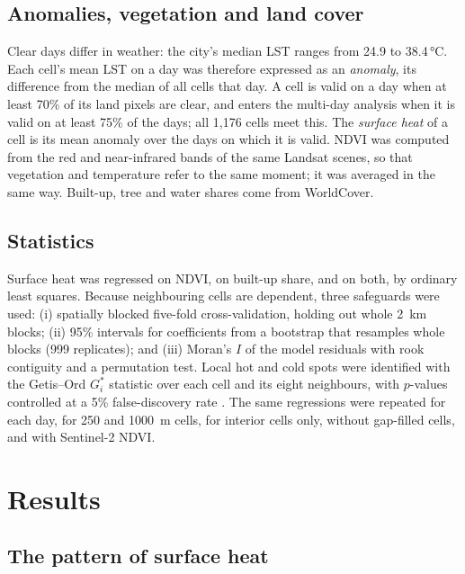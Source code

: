 \documentclass[11pt,a4paper]{article}
\begin{document}
\subsection{Anomalies, vegetation and land cover}

Clear days differ in weather: the city's median LST ranges from 24.9 to 38.4\,°C. Each cell's mean LST on a day was therefore expressed as an \emph{anomaly}, its difference from the median of all cells that day. A cell is valid on a day when at least 70\% of its land pixels are clear, and enters the multi-day analysis when it is valid on at least 75\% of the days; all 1,176 cells meet this. The \emph{surface heat} of a cell is its mean anomaly over the days on which it is valid. NDVI was computed from the red and near-infrared bands of the same Landsat scenes, so that vegetation and temperature refer to the same moment; it was averaged in the same way. Built-up, tree and water shares come from WorldCover.

\subsection{Statistics}

Surface heat was regressed on NDVI, on built-up share, and on both, by ordinary least squares. Because neighbouring cells are dependent, three safeguards were used: (i) spatially blocked five-fold cross-validation, holding out whole 2~km blocks; (ii) 95\% intervals for coefficients from a bootstrap that resamples whole blocks (999 replicates); and (iii) Moran's $I$ of the model residuals with rook contiguity and a permutation test. Local hot and cold spots were identified with the Getis–Ord $G_i^*$ statistic over each cell and its eight neighbours, with $p$-values controlled at a 5\% false-discovery rate \cite{benjamini1995}. The same regressions were repeated for each day, for 250 and 1000~m cells, for interior cells only, without gap-filled cells, and with Sentinel-2 NDVI.

\section{Results}
\label{sec:results}

\subsection{The pattern of surface heat}
\end{document}

